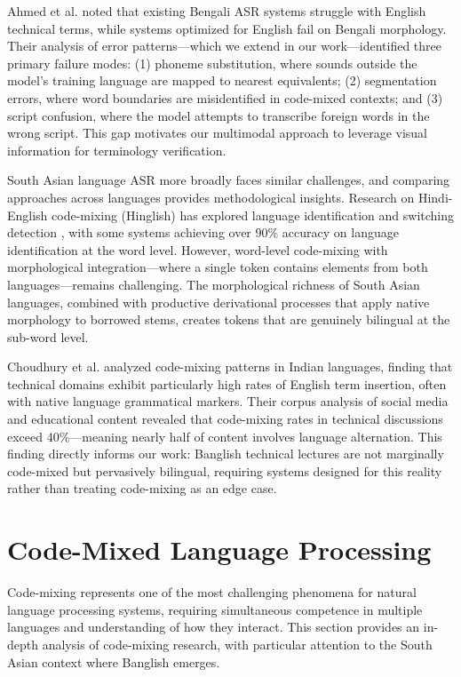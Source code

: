 Ahmed et al. \cite{Ahmed2022} noted that existing Bengali ASR systems struggle with English technical terms, while systems optimized for English fail on Bengali morphology. Their analysis of error patterns---which we extend in our work---identified three primary failure modes: (1) phoneme substitution, where sounds outside the model's training language are mapped to nearest equivalents; (2) segmentation errors, where word boundaries are misidentified in code-mixed contexts; and (3) script confusion, where the model attempts to transcribe foreign words in the wrong script. This gap motivates our multimodal approach to leverage visual information for terminology verification.

South Asian language ASR more broadly faces similar challenges, and comparing approaches across languages provides methodological insights. Research on Hindi-English code-mixing (Hinglish) has explored language identification and switching detection \cite{Sitaram2019}, with some systems achieving over 90\% accuracy on language identification at the word level. However, word-level code-mixing with morphological integration---where a single token contains elements from both languages---remains challenging. The morphological richness of South Asian languages, combined with productive derivational processes that apply native morphology to borrowed stems, creates tokens that are genuinely bilingual at the sub-word level.

Choudhury et al. \cite{Choudhury2007} analyzed code-mixing patterns in Indian languages, finding that technical domains exhibit particularly high rates of English term insertion, often with native language grammatical markers. Their corpus analysis of social media and educational content revealed that code-mixing rates in technical discussions exceed 40\%---meaning nearly half of content involves language alternation. This finding directly informs our work: Banglish technical lectures are not marginally code-mixed but pervasively bilingual, requiring systems designed for this reality rather than treating code-mixing as an edge case.

\section{Code-Mixed Language Processing}

Code-mixing represents one of the most challenging phenomena for natural language processing systems, requiring simultaneous competence in multiple languages and understanding of how they interact. This section provides an in-depth analysis of code-mixing research, with particular attention to the South Asian context where Banglish emerges.

